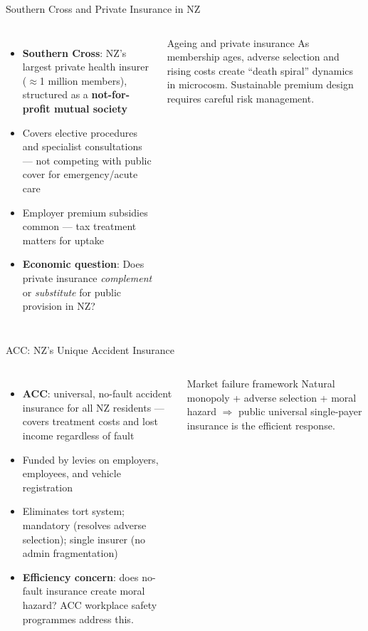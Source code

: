 \documentclass[aspectratio=169, 12pt]{beamer}
\begin{document}
\begin{frame}{Southern Cross and Private Insurance in NZ}
  \begin{columns}
      \small
      \begin{itemize}
        \item \textbf{Southern Cross}: NZ's largest private health insurer ($\approx$1 million
              members), structured as a \textbf{not-for-profit mutual society}
        \item Covers elective procedures and specialist consultations --- not competing with
              public cover for emergency/acute care
        \item Employer premium subsidies common --- tax treatment matters for uptake
        \item \textbf{Economic question}: Does private insurance \emph{complement} or
              \emph{substitute} for public provision in NZ?
      \end{itemize}
      \begin{alertblock}{Ageing and private insurance}
        \small As membership ages, adverse selection and rising costs create ``death spiral''
        dynamics in microcosm. Sustainable premium design requires careful risk management.
      \end{alertblock}
  \end{columns}
\end{frame}

\begin{frame}{ACC: NZ's Unique Accident Insurance}
  \begin{columns}
      \footnotesize
      \begin{itemize}
        \item \textbf{ACC}: universal, no-fault accident insurance for all NZ residents ---
              covers treatment costs and lost income regardless of fault
        \item Funded by levies on employers, employees, and vehicle registration
        \item Eliminates tort system; mandatory (resolves adverse selection); single
              insurer (no admin fragmentation)
        \item \textbf{Efficiency concern}: does no-fault insurance create moral hazard?
              ACC workplace safety programmes address this.
      \end{itemize}
      \begin{block}{Market failure framework}
        \small Natural monopoly + adverse selection + moral hazard $\Rightarrow$ public
        universal single-payer insurance is the efficient response.
      \end{block}
  \end{columns}
\end{frame}
\end{document}
